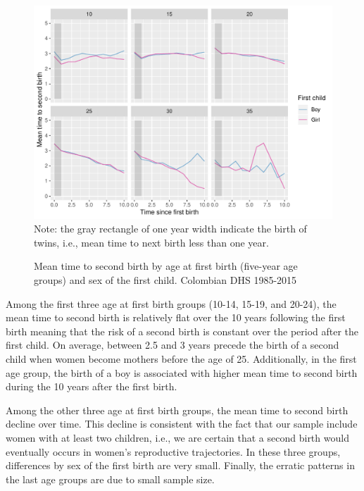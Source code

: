 \documentclass{article}
\begin{document}
\begin{figure}[H]
\centering
\caption{Mean time to second birth by age at first birth (five-year age groups) and sex of the first child. Colombian DHS 1985-2015}
    \includegraphics[scale=0.8]{Spells/Figures/mt_second_birth_by_sex_first.pdf}\\
    \label{fert_01}
    Note: the gray rectangle of one year width indicate the birth of twins, i.e., mean time to next birth less than one year.
\end{figure}

Among the first three age at first birth groups (10-14, 15-19, and 20-24), the mean time to second birth is relatively flat over the 10 years following the first birth meaning that the risk of a second birth is constant over the period after the first child. On average, between 2.5 and 3 years precede the birth of a second child when women become mothers before the age of 25. Additionally, in the first age group, the birth of a boy is associated with higher mean time to second birth during the 10 years after the first birth.

Among the other three age at first birth groups, the mean time to second birth decline over time. This decline is consistent with the fact that our sample include women with at least two children, i.e., we are certain that a second birth would eventually occurs in women's reproductive trajectories. In these three groups, differences by sex of the first birth are very small. Finally, the erratic patterns in the last age groups are due to small sample size.
\end{document}

